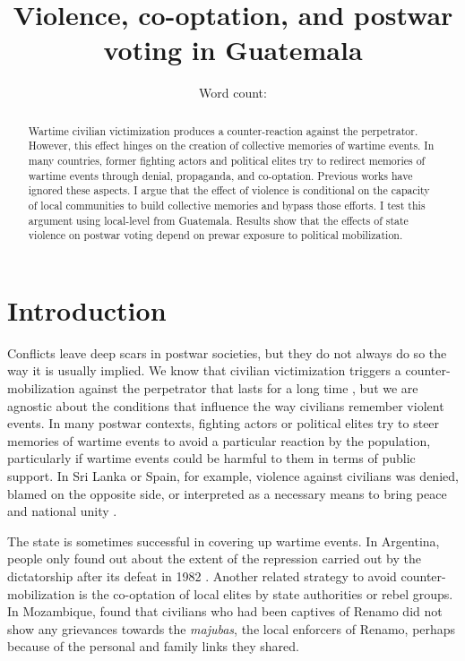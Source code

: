 \documentclass[12pt, notitlepage]{article}
\title{\Large Violence, co-optation, and postwar voting in Guatemala}
\author{}%
\date{Word count: {\color{red}{\textbf{around 11,700}}}}
\begin{document}
\maketitle
\thispagestyle{empty}

\vspace{30pt}

\begin{abstract}

Wartime civilian victimization produces a counter-reaction against the perpetrator. However, this effect hinges on the creation of collective memories of wartime events. In many countries, former fighting actors and political elites try to redirect memories of wartime events through denial, propaganda, and co-optation. Previous works have ignored these aspects. I argue that the effect of violence is conditional on the capacity of local communities to build collective memories and bypass those efforts. I test this argument using local-level from Guatemala. Results show that the effects of state violence on postwar voting depend on prewar exposure to political mobilization.

\end{abstract}

\newpage
\setcounter{page}{1}

\section*{Introduction}

Conflicts leave deep scars in postwar societies, but they do not always do so the way it is usually implied.
We know that civilian victimization triggers a counter-mobilization against the perpetrator that lasts for a long time \citep{Balcells:2012aa, Lupu:2017aa, Fontana:2017aa, Rozenas:2017aa, Rozenas:2019aa}, but we are agnostic about the conditions that influence the way civilians remember violent events.
In many postwar contexts, fighting actors or political elites try to steer memories of wartime events to avoid a particular reaction by the population, particularly if wartime events could be harmful to them in terms of public support.
In Sri Lanka or Spain, for example, violence against civilians was denied, blamed on the opposite side, or interpreted as a necessary means to bring peace and national unity \citep{Seoighe:2017aa, Palomares:2004aa}.

The state is sometimes successful in covering up wartime events.
In Argentina, people only found out about the extent of the repression carried out by the dictatorship after its defeat in 1982 \citep{Robben:1995aa}.
Another related strategy to avoid counter-mobilization is the co-optation of local elites by state authorities or rebel groups.
In Mozambique, \citet{Finnegan:1992aa} found that civilians who had been captives of Renamo did not show any grievances towards the \textit{majubas}, the local enforcers of Renamo, perhaps because of the personal and family links they shared.
\end{document}
